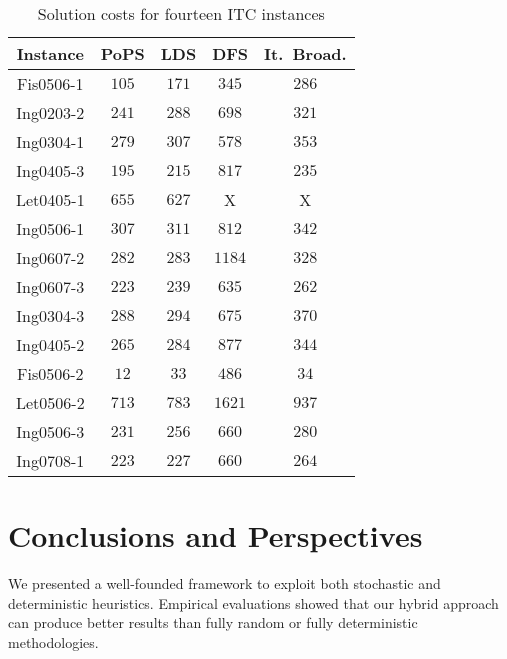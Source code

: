 \documentclass{ws-ijait}
\begin{document}
\begin{table}
\centering
\caption{Solution costs for fourteen ITC instances\label{PopsItc}}
\begin{tabular}{|c|c|c|c|c|}
\hline
                      Instance & PoPS & LDS & DFS & It.\ Broad. \\
\hline
\hline
\textsf{Fis0506-1} &  $\mathit{105}$ & $171$ & $345$ & $286$  \\ \hline
\textsf{Ing0203-2} &  $\mathit{241}$ & $288$ & $698$ & $321$  \\ \hline
\textsf{Ing0304-1} &  $\mathit{279}$ & $307$ & $578$ & $353$  \\ \hline
\textsf{Ing0405-3} &  $\mathit{195}$ & $215$ & $817$ & $235$  \\ \hline
\textsf{Let0405-1} &  $655$ & $\mathit{627}$ & X & X          \\ \hline
\textsf{Ing0506-1} &  $\mathit{307}$ & $311$ & $812$ & $342$  \\ \hline
\textsf{Ing0607-2} &  $\mathit{282}$ & $283$ & $1184$ & $328$ \\ \hline
\textsf{Ing0607-3} &  $\mathit{223}$ & $239$ & $635$ & $262$  \\ \hline
\textsf{Ing0304-3} &  $\mathit{288}$ & $294$ & $675$ & $370$  \\ \hline
\textsf{Ing0405-2} &  $\mathit{265}$ & $284$ & $877$ & $344$  \\ \hline
\textsf{Fis0506-2} &  $\mathit{12}$ & $33$ & $486$ & $34$     \\ \hline
\textsf{Let0506-2} &  $\mathit{713}$ & $783$ & $1621$ & $937$ \\ \hline
\textsf{Ing0506-3} &  $\mathit{231}$ & $256$ & $660$ & $280$  \\ \hline
\textsf{Ing0708-1} &  $\mathit{223}$ & $227$ & $660$ & $264$  \\ \hline
\end{tabular}
\end{table}


\section{Conclusions and Perspectives}

We presented a well-founded framework to exploit both stochastic and deterministic heuristics. Empirical evaluations showed that our hybrid approach can produce better results than fully random or fully deterministic methodologies.

\end{document}
